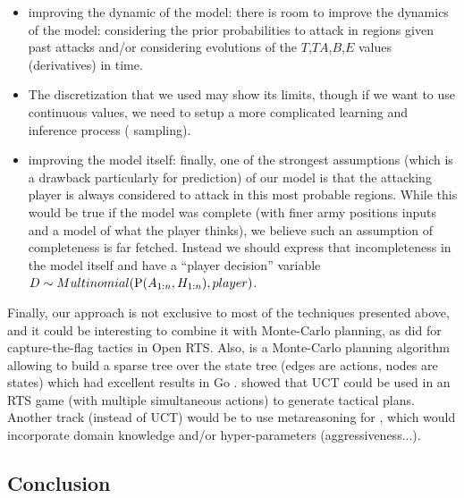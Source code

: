 \begin{itemize}
    \item improving the dynamic of the model: there is room to improve the dynamics of the model: considering the prior probabilities to attack in regions given past attacks and/or considering evolutions of the $T$,$TA$,$B$,$E$ values (derivatives) in time.
    \item The discretization that we used may show its limits, though if we want to use continuous values, we need to setup a more complicated learning and inference process ( sampling).
    \item improving the model itself: finally, one of the strongest assumptions (which is a drawback particularly for prediction) of our model is that the attacking player is always considered to attack in this most probable regions. While this would be true if the model was complete (with finer army positions inputs and a model of what the player thinks), we believe such an assumption of completeness is far fetched. Instead we should express that incompleteness in the model itself and have a ``player decision'' variable $D \sim Multinomial(\mathrm{P}(A_{1:n},H_{1:n}),player)$.
\end{itemize} 

Finally, our approach is not exclusive to most of the techniques presented above, and it could be interesting to combine it with %
Monte-Carlo planning, as \cite{Chung05} did for capture-the-flag tactics in Open RTS. Also,  is a Monte-Carlo planning algorithm allowing to build a sparse tree over the state tree (edges are actions, nodes are states) which had excellent results in Go \citep{GellyUCT,GellySchoenauer}. \cite{UCT} showed that UCT could be used in an RTS game (with multiple simultaneous actions) to generate tactical plans. Another track (instead of UCT) would be to use metareasoning for  \citep{metaMCTS}, which would incorporate domain knowledge and/or hyper-parameters (aggressiveness...).

\subsection{Conclusion}


